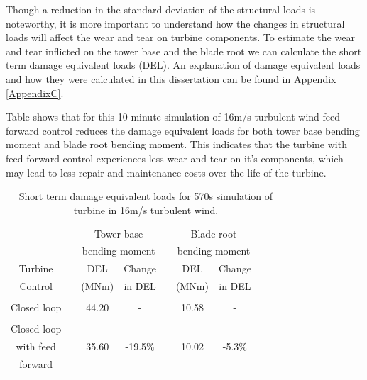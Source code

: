 Though a reduction in the standard deviation of the structural loads is noteworthy, it is more important to understand how the changes in structural loads will affect the wear and tear on turbine components. To estimate the wear and tear inflicted on the tower base and the blade root we can calculate the short term damage equivalent loads (DEL). An explanation of damage equivalent loads and how they were calculated in this dissertation can be found in Appendix \ref{AppendixC}. 

Table shows that for this 10 minute simulation of 16m/s turbulent wind feed forward control reduces the damage equivalent loads for both tower base bending moment and blade root bending moment. This indicates that the turbine with feed forward control experiences less wear and tear on it's components, which may lead to less repair and maintenance costs over the life of the turbine.


\begin{table}
\centering
\begin{tabular}{ c | c c c c c c c c c}
\hline
\hline
					&&\multicolumn{2}{c}{Tower base}					&&\multicolumn{2}{c}{Blade	root} \\
					&&\multicolumn{2}{c}{bending moment}			&&\multicolumn{2}{c}{bending moment}\\
						\cline{3-4} 														\cline{6-7}
Turbine			&& DEL   	& Change										&& DEL  	& Change\\
Control			&& (MNm)  & in DEL 										&& (MNm)  & in DEL 	\\
\hline
\\
Closed loop  && 44.20 & - 													&& 10.58 & - \\
 \\
Closed loop\\
with feed  		&& 35.60 & -19.5$\%$ 									&& 10.02 & -5.3$\%$\\
forward\\
\hline
\hline
\end{tabular}
\caption{Short term damage equivalent loads for 570s simulation of turbine  in 16m/s turbulent wind.}
\label{Table3-3}
\end{table}



